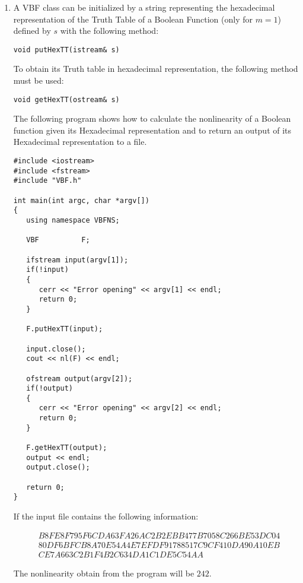 \begin{enumerate}
\item A VBF class can be initialized by a string representing the hexadecimal representation of the Truth Table of a Boolean Function (only for $m=1$) defined by $s$ with the following method:

\begin{verbatim}
void putHexTT(istream& s)
\end{verbatim}

To obtain its Truth table in hexadecimal representation, the following method must be used:

\begin{verbatim}
void getHexTT(ostream& s)
\end{verbatim}

The following program shows how to calculate the nonlinearity of a Boolean function given its Hexadecimal representation and to return an output of its Hexadecimal representation to a file.

\begin{verbatim}
#include <iostream>
#include <fstream>
#include "VBF.h"

int main(int argc, char *argv[])
{
   using namespace VBFNS;

   VBF          F;

   ifstream input(argv[1]);
   if(!input)
   {
      cerr << "Error opening" << argv[1] << endl;
      return 0;
   }

   F.putHexTT(input);

   input.close();
   cout << nl(F) << endl;

   ofstream output(argv[2]);
   if(!output)
   {
      cerr << "Error opening" << argv[2] << endl;
      return 0;
   }

   F.getHexTT(output);
   output << endl;
   output.close();

   return 0;
}
\end{verbatim}

If the input file contains the following information:

\begin{equation*}
\begin{array}{ll}
& B8FE8F795F6CDA63FA26AC2B2EBB477B7058C266BE53DC04 \\
& 80DF6BFCB8A70E54A4E7EFDF91788517C9CF410DA90A10EB \\
& CE7A663C2B1F4B2C634DA1C1DE5C54AA
\end{array}
\end{equation*}

The nonlinearity obtain from the program will be $242$.


\end{enumerate}
